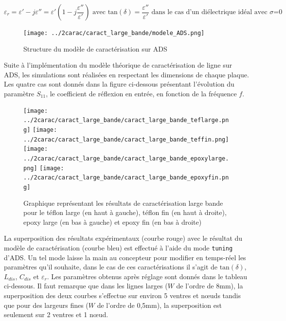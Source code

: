 \documentclass[french]{article}
\begin{document}
\begin{equation}
	\varepsilon_r=\varepsilon'-j\varepsilon''=\varepsilon'(1-j\frac{\varepsilon''}{\varepsilon'}) \mbox{ avec } \mbox{tan}(\delta)=\frac{\varepsilon''}{\varepsilon'} \mbox{ dans le cas d'un diélectrique idéal avec $\sigma$=0}
\end{equation}

\begin{figure}[H]
	\centering
	\texttt{[image: ../2carac/caract\_large\_bande/modele\_ADS.png]}
	\caption{Structure du modèle de caractérisation sur ADS}
	\label{fig:modele_caract_ADS}
\end{figure}

\newpage

Suite à l'implémentation du modèle théorique de caractérisation de ligne sur ADS, les simulations sont réalisées en respectant les dimensions de chaque plaque. Les quatre cas sont donnés dans la figure ci-dessous présentant l'évolution du paramètre $S_{11}$, le coefficient de réflexion en entrée, en fonction de la fréquence $f$.

\begin{figure}[H]
	\centering
	\texttt{[image: ../2carac/caract\_large\_bande/caract\_large\_bande\_teflarge.png]}
	\texttt{[image: ../2carac/caract\_large\_bande/caract\_large\_bande\_teffin.png]}\\
	\texttt{[image: ../2carac/caract\_large\_bande/caract\_large\_bande\_epoxylarge.png]}
	\texttt{[image: ../2carac/caract\_large\_bande/caract\_large\_bande\_epoxyfin.png]}
	\caption{Graphique représentant les résultats de caractérisation large bande pour le téflon large (en haut à gauche), téflon fin (en haut à droite), epoxy large (en bas à gauche) et epoxy fin (en bas à droite)}
	\label{fig:caracterisations}
\end{figure}

La superposition des résultats expérimentaux (courbe rouge) avec le résultat du modèle de caractérisation (courbe bleu) est effectué à l'aide du mode \texttt{tuning} d'ADS. Un tel mode laisse la main au concepteur pour modifier en temps-réel les paramètres qu'il souhaite, dans le cas de ces caractérisations il s'agit de $\mbox{tan}(\delta)$, $L_{dis}$, $C_{dis}$ et $\varepsilon_r$. Les paramètres obtenus après réglage sont donnés dans le tableau ci-dessous. Il faut remarque que dans les lignes larges ($W$ de l'ordre de 8mm), la superposition des deux courbes s'effectue sur environ 5 ventres et nœuds tandis que pour des largeurs fines ($W$ de l'ordre de 0,5mm), la superposition est seulement sur 2 ventres et 1 nœud.
\end{document}
